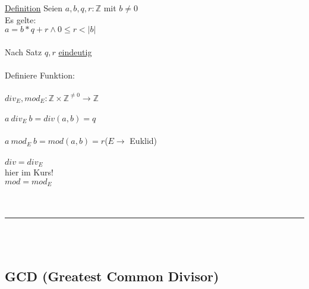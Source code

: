 \documentclass[18pt,a4paper]{article}
\newcommand{\tab}{\hspace*{2em}}
\begin{document}
\\
\\
\uline{Definition} Seien $a,b,q,r : \mathbb{Z}$ mit $b \neq 0$\\
Es gelte:\\
\tab $a = b * q + r \wedge 0 \leqslant r < |b|$\\
\\
Nach Satz $q,r$ \uline{eindeutig}\\
\\
Definiere Funktion:\\
\\
$div_E, mod_E : \mathbb{Z} \times \mathbb{Z}^{\neq 0} \rightarrow \mathbb{Z}$\\
\\
$a\: div_E\: b = div(a,b) = q$\\
\\
$a\: mod_E\: b = mod(a,b) = r$\tab ($E \rightarrow$ Euklid)\\ 
\\
$div = div_E$\\
\tab hier im Kurs!\\
$mod = mod_E$\\
\\
\\
\rule{\textwidth}{0.4mm}\\
\\

\subsection{GCD (Greatest Common Divisor)}
\end{document}
